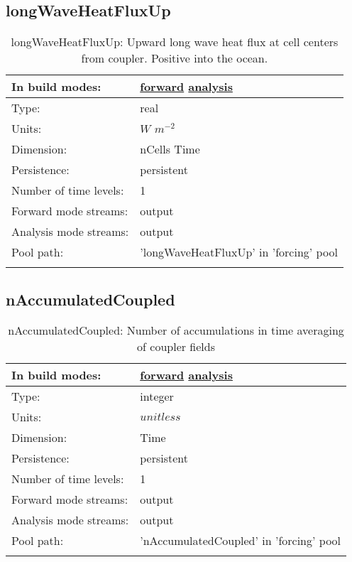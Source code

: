 \subsection[longWaveHeatFluxUp]{longWaveHeatFluxUp}
\label{subsec:var_sec_forcing_longWaveHeatFluxUp}
\begin{center}
\begin{longtable}{| p{2.0in} | p{4.0in} |}
        \hline 
        In build modes: & \hyperref[subsec:forward_var_tab_forcing]{forward} \hyperref[subsec:analysis_var_tab_forcing]{analysis} \\
        \hline 
        Type: & real \\
        \hline 
        Units: & $W$ $m^{-2}$ \\
        \hline 
        Dimension: & nCells Time \\
        \hline 
        Persistence: & persistent \\
        \hline 
        Number of time levels: & 1 \\
        \hline 
		 Forward mode streams: &  output \\
        \hline 
		 Analysis mode streams: &  output \\
        \hline 
            Pool path: & 'longWaveHeatFluxUp' in 'forcing' pool
 \\
		 \hline 
    \caption{longWaveHeatFluxUp: Upward long wave heat flux at cell centers from coupler. Positive into the ocean.}
\end{longtable}
\end{center}
\subsection[nAccumulatedCoupled]{nAccumulatedCoupled}
\label{subsec:var_sec_forcing_nAccumulatedCoupled}
\begin{center}
\begin{longtable}{| p{2.0in} | p{4.0in} |}
        \hline 
        In build modes: & \hyperref[subsec:forward_var_tab_forcing]{forward} \hyperref[subsec:analysis_var_tab_forcing]{analysis} \\
        \hline 
        Type: & integer \\
        \hline 
        Units: & $unitless$ \\
        \hline 
        Dimension: & Time \\
        \hline 
        Persistence: & persistent \\
        \hline 
        Number of time levels: & 1 \\
        \hline 
		 Forward mode streams: &  output \\
        \hline 
		 Analysis mode streams: &  output \\
        \hline 
            Pool path: & 'nAccumulatedCoupled' in 'forcing' pool
 \\
		 \hline 
    \caption{nAccumulatedCoupled: Number of accumulations in time averaging of coupler fields}
\end{longtable}
\end{center}
